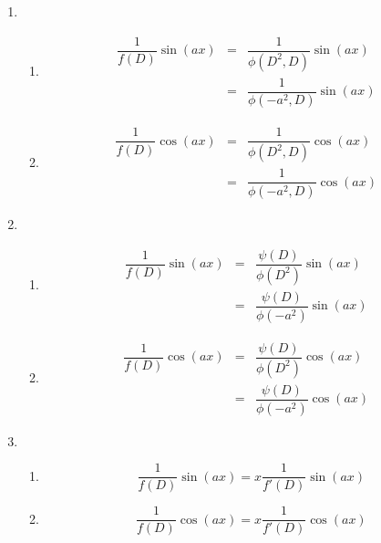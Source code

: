 \begin{enumerate}
	\item
	\begin{enumerate}
		\item
		\begin{equation}
			\begin{aligned}
				\dfrac{1}{f(D)} \sin (ax) &=& \dfrac{1}{\phi(D^2,D)} \sin (ax)&\\ &=&\dfrac{1}{\phi(-a^2,D)} \sin (ax)
			\end{aligned}
		\end{equation}

		\item
		\begin{equation}
			\begin{aligned}
				\dfrac{1}{f(D)} \cos (ax) &=& \dfrac{1}{\phi(D^2,D)} \cos (ax)&\\ &=&\dfrac{1}{\phi(-a^2,D)} \cos (ax)
			\end{aligned}
		\end{equation}
	\end{enumerate}

	\item \begin{enumerate}
		\item
		\begin{equation}
			\begin{aligned}
				\dfrac{1}{f(D)} \sin (ax) &=& \dfrac{\psi(D)}{\phi(D^2)} \sin (ax)&\\ &=&\dfrac{\psi(D)}{\phi(-a^2)} \sin (ax)
			\end{aligned}
		\end{equation}

		\item
		\begin{equation}
			\begin{aligned}
				\dfrac{1}{f(D)} \cos (ax) &=& \dfrac{\psi(D)}{\phi(D^2)} \cos (ax)&\\ &=&\dfrac{\psi(D)}{\phi(-a^2)} \cos (ax)
			\end{aligned}
		\end{equation}
	\end{enumerate}

	\item
	\begin{enumerate}
		\item
		\begin{equation}
			\dfrac{1}{f(D)} \sin (ax) = x\dfrac{1}{f'(D)} \sin (ax)
		\end{equation}

		\item
		\begin{equation}
			\dfrac{1}{f(D)} \cos (ax) = x\dfrac{1}{f'(D)} \cos (ax)
		\end{equation}
	\end{enumerate}
\end{enumerate}


